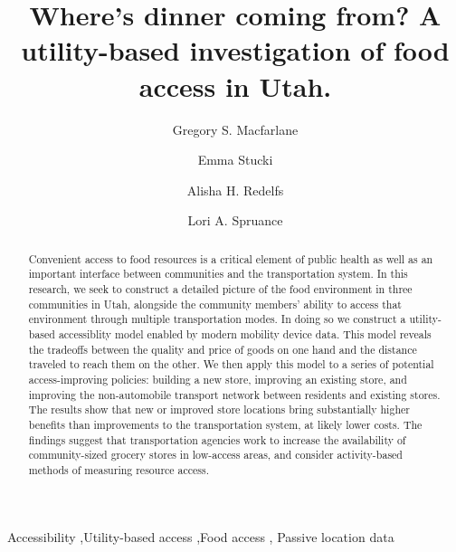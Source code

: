 \documentclass[
  letterpaper,
  number,
  review,
  3p]{elsarticle}
\begin{document}
\begin{frontmatter}
\title{Where's dinner coming from? A utility-based investigation of food
access in Utah.}
\author[1]{Gregory S. Macfarlane%
%
}
\author[1]{Emma Stucki%
%
}

\author[2]{Alisha H. Redelfs%
%
}

\author[2]{Lori A. Spruance%
%
}







        
\begin{abstract}
Convenient access to food resources is a critical element of public
health as well as an important interface between communities and the
transportation system. In this research, we seek to construct a detailed
picture of the food environment in three communities in Utah, alongside
the community members' ability to access that environment through
multiple transportation modes. In doing so we construct a utility-based
accessiblity model enabled by modern mobility device data. This model
reveals the tradeoffs between the quality and price of goods on one hand
and the distance traveled to reach them on the other. We then apply this
model to a series of potential access-improving policies: building a new
store, improving an existing store, and improving the non-automobile
transport network between residents and existing stores. The results
show that new or improved store locations bring substantially higher
benefits than improvements to the transportation system, at likely lower
costs. The findings suggest that transportation agencies work to
increase the availability of community-sized grocery stores in
low-access areas, and consider activity-based methods of measuring
resource access.
\end{abstract}





\begin{keyword}
    Accessibility \sep Utility-based access \sep Food access \sep 
    Passive location data
\end{keyword}
\end{frontmatter}
    
\end{document}
